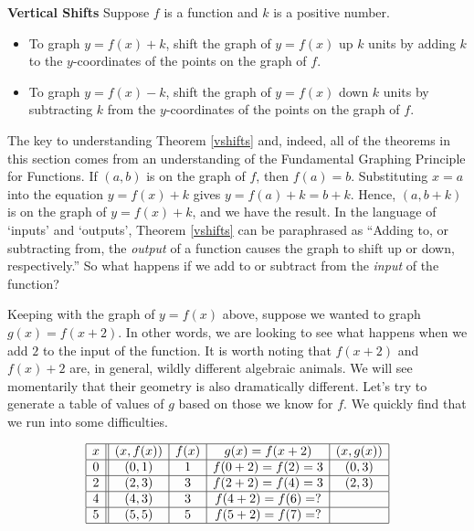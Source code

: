 \smallskip

\bbm


\begin{thm}\label{vshifts}\textbf{Vertical Shifts} Suppose $f$ is a function and $k$ is a positive number. 

\begin{itemize}

\item To graph $y=f(x)+k$, shift the graph of $y=f(x)$ up $k$ units by adding $k$ to the $y$-coordinates of the points on the graph of $f$.

\item To graph $y=f(x)-k$, shift the graph of $y=f(x)$ down $k$ units by subtracting $k$ from the $y$-coordinates of the points on the graph of $f$.

\end{itemize}

\end{thm}

\ebm

\smallskip

The key to understanding Theorem \ref{vshifts} and, indeed, all of the theorems in this section comes from an  understanding of the Fundamental Graphing Principle for Functions.  If $(a,b)$ is on the graph of $f$, then $f(a) = b$.  Substituting $x=a$ into the equation  $y=f(x)+k$ gives $y=f(a)+k = b+k$.  Hence, $(a,b+k)$ is on the graph of $y=f(x)+k$, and we have the result.  In the language of `inputs' and `outputs', Theorem \ref{vshifts} can be paraphrased as ``Adding to, or subtracting from, the \textit{output} of a function causes the graph to shift up or down, respectively.''   So what happens if we add to or subtract from the \textit{input} of the function?  

\smallskip

Keeping with the graph of $y=f(x)$ above, suppose we wanted to graph $g(x) = f(x+2)$.  In other words, we are looking to see what happens when we add $2$ to the input of the function.  It is worth noting that $f(x+2)$ and $f(x)+2$ are, in general, wildly different algebraic animals.   We will see momentarily that their geometry is also dramatically different.  Let's try to generate a table of values of $g$ based on those we know for $f$.  We quickly find that we run into some difficulties.

\[ \begin{array}{|c||c|c|c|c|}  

\hline

x & (x,f(x)) & f(x)& g(x)=f(x+2) & (x, g(x)) \\ \hline
0  & (0,1)& 1 & f(0+2) = f(2) = 3   &(0, 3) \\  \hline
2 & (2,3) & 3 & f(2+2) = f(4) = 3  &(2,3) \\  \hline
4 & (4,3) & 3 &  f(4+2) = f(6) = ? &  \\  \hline
5 & (5,5) & 5 & f(5+2) = f(7) = ?  &  \\  \hline

\end{array} \] 

